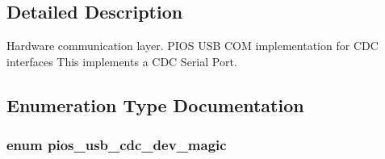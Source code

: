 \subsection{Detailed Description}
Hardware communication layer. P\-I\-O\-S U\-S\-B C\-O\-M implementation for C\-D\-C interfaces  This implements a C\-D\-C Serial Port.

\subsection{Enumeration Type Documentation}
\hypertarget{group___p_i_o_s___u_s_b___c_o_m_gab4c476b0e464c59dcf6eadec015a87b8}{
\subsubsection[{pios\-\_\-usb\-\_\-cdc\-\_\-dev\-\_\-magic}]{\setlength{\rightskip}{0pt plus 5cm}enum {\bf pios\-\_\-usb\-\_\-cdc\-\_\-dev\-\_\-magic}}}\label{group___p_i_o_s___u_s_b___c_o_m_gab4c476b0e464c59dcf6eadec015a87b8}
